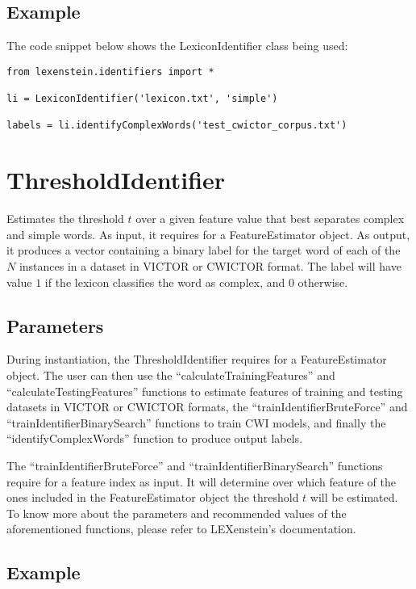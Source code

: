 \subsection{Example}

The code snippet below shows the LexiconIdentifier class being used:

\begin{lstlisting}
from lexenstein.identifiers import *

li = LexiconIdentifier('lexicon.txt', 'simple')

labels = li.identifyComplexWords('test_cwictor_corpus.txt')
\end{lstlisting}



\section{ThresholdIdentifier}

Estimates the threshold $t$ over a given feature value that best separates complex and simple words. As input, it requires for a FeatureEstimator object. As output, it produces a vector containing a binary label for the target word of each of the $N$ instances in a dataset in VICTOR or CWICTOR format. The label will have value $1$ if the lexicon classifies the word as complex, and $0$ otherwise.

\subsection{Parameters}

During instantiation, the ThresholdIdentifier requires for a FeatureEstimator object. The user can then use the ``calculateTrainingFeatures'' and ``calculateTestingFeatures'' functions to estimate features of training and testing datasets in VICTOR or CWICTOR formats, the ``trainIdentifierBruteForce'' and ``trainIdentifierBinarySearch'' functions to train CWI models, and finally the ``identifyComplexWords'' function to produce output labels.

The ``trainIdentifierBruteForce'' and ``trainIdentifierBinarySearch'' functions require for a feature index as input. It will determine over which feature of the ones included in the FeatureEstimator object the threshold $t$ will be estimated. To know more about the parameters and recommended values of the aforementioned functions, please refer to LEXenstein's documentation.

\subsection{Example}

